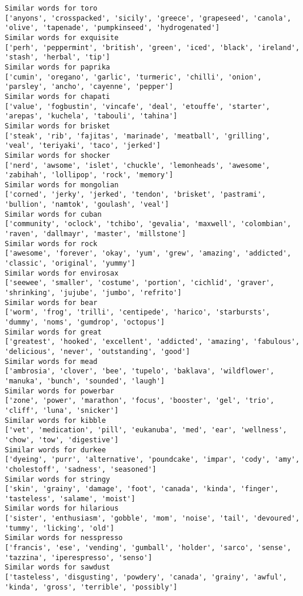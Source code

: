 \documentclass[11pt]{article}
\begin{document}
\begin{Verbatim}[commandchars=\\\{\}]
Similar words for toro
['anyons', 'crosspacked', 'sicily', 'greece', 'grapeseed', 'canola', 'olive', 'tapenade', 'pumpkinseed', 'hydrogenated']
Similar words for exquisite
['perh', 'peppermint', 'british', 'green', 'iced', 'black', 'ireland', 'stash', 'herbal', 'tip']
Similar words for paprika
['cumin', 'oregano', 'garlic', 'turmeric', 'chilli', 'onion', 'parsley', 'ancho', 'cayenne', 'pepper']
Similar words for chapati
['value', 'fogbustin', 'vincafe', 'deal', 'etouffe', 'starter', 'arepas', 'kuchela', 'tabouli', 'tahina']
Similar words for brisket
['steak', 'rib', 'fajitas', 'marinade', 'meatball', 'grilling', 'veal', 'teriyaki', 'taco', 'jerked']
Similar words for shocker
['nerd', 'awsome', 'islet', 'chuckle', 'lemonheads', 'awesome', 'zabihah', 'lollipop', 'rock', 'memory']
Similar words for mongolian
['corned', 'jerky', 'jerked', 'tendon', 'brisket', 'pastrami', 'bullion', 'namtok', 'goulash', 'veal']
Similar words for cuban
['community', 'oclock', 'tchibo', 'gevalia', 'maxwell', 'colombian', 'raven', 'dallmayr', 'master', 'millstone']
Similar words for rock
['awesome', 'forever', 'okay', 'yum', 'grew', 'amazing', 'addicted', 'classic', 'original', 'yummy']
Similar words for envirosax
['seewee', 'smaller', 'costume', 'portion', 'cichlid', 'graver', 'shrinking', 'jujube', 'jumbo', 'refrito']
Similar words for bear
['worm', 'frog', 'trilli', 'centipede', 'harico', 'starbursts', 'dummy', 'noms', 'gumdrop', 'octopus']
Similar words for great
['greatest', 'hooked', 'excellent', 'addicted', 'amazing', 'fabulous', 'delicious', 'never', 'outstanding', 'good']
Similar words for mead
['ambrosia', 'clover', 'bee', 'tupelo', 'baklava', 'wildflower', 'manuka', 'bunch', 'sounded', 'laugh']
Similar words for powerbar
['zone', 'power', 'marathon', 'focus', 'booster', 'gel', 'trio', 'cliff', 'luna', 'snicker']
Similar words for kibble
['vet', 'medication', 'pill', 'eukanuba', 'med', 'ear', 'wellness', 'chow', 'tow', 'digestive']
Similar words for durkee
['dyeing', 'purr', 'alternative', 'poundcake', 'impar', 'cody', 'amy', 'cholestoff', 'sadness', 'seasoned']
Similar words for stringy
['skin', 'grainy', 'damage', 'foot', 'canada', 'kinda', 'finger', 'tasteless', 'salame', 'moist']
Similar words for hilarious
['sister', 'enthusiasm', 'gobble', 'mom', 'noise', 'tail', 'devoured', 'tummy', 'licking', 'old']
Similar words for nesspresso
['francis', 'ese', 'vending', 'gumball', 'holder', 'sarco', 'sense', 'tazzina', 'iperespresso', 'senso']
Similar words for sawdust
['tasteless', 'disgusting', 'powdery', 'canada', 'grainy', 'awful', 'kinda', 'gross', 'terrible', 'possibly']

\end{Verbatim}
\end{document}
